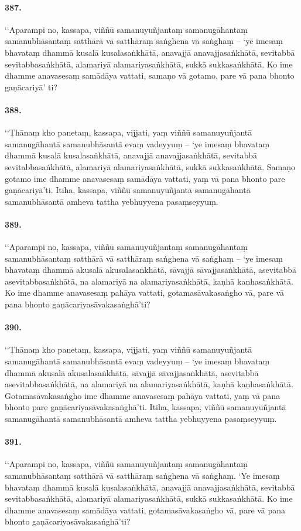 \paragraph{387.} ‘‘Aparampi no, kassapa, viññū samanuyuñjantaṃ samanugāhantaṃ samanubhāsantaṃ satthārā vā satthāraṃ saṅghena vā saṅghaṃ – ‘ye imesaṃ bhavataṃ dhammā kusalā kusalasaṅkhātā, anavajjā anavajjasaṅkhātā, sevitabbā sevitabbasaṅkhātā, alamariyā alamariyasaṅkhātā, sukkā sukkasaṅkhātā. Ko ime dhamme anavasesaṃ samādāya vattati, samaṇo vā gotamo, pare vā pana bhonto gaṇācariyā’ ti?

\paragraph{388.} ‘‘Ṭhānaṃ kho panetaṃ, kassapa, vijjati, yaṃ viññū samanuyuñjantā samanugāhantā samanubhāsantā evaṃ vadeyyuṃ – ‘ye imesaṃ bhavataṃ dhammā kusalā kusalasaṅkhātā, anavajjā anavajjasaṅkhātā, sevitabbā sevitabbasaṅkhātā, alamariyā alamariyasaṅkhātā, sukkā sukkasaṅkhātā. Samaṇo gotamo ime dhamme anavasesaṃ samādāya vattati, yaṃ vā pana bhonto pare gaṇācariyā’ti. Itiha, kassapa, viññū samanuyuñjantā samanugāhantā samanubhāsantā amheva tattha yebhuyyena pasaṃseyyuṃ.

\paragraph{389.} ‘‘Aparampi no, kassapa, viññū samanuyuñjantaṃ samanugāhantaṃ samanubhāsantaṃ satthārā vā satthāraṃ saṅghena vā saṅghaṃ – ‘ye imesaṃ bhavataṃ dhammā akusalā akusalasaṅkhātā, sāvajjā sāvajjasaṅkhātā, asevitabbā asevitabbasaṅkhātā, na alamariyā na alamariyasaṅkhātā, kaṇhā kaṇhasaṅkhātā. Ko ime dhamme anavasesaṃ pahāya vattati, gotamasāvakasaṅgho vā, pare vā pana bhonto gaṇācariyasāvakasaṅghā’ti?

\paragraph{390.} ‘‘Ṭhānaṃ kho panetaṃ, kassapa, vijjati, yaṃ viññū samanuyuñjantā samanugāhantā samanubhāsantā evaṃ vadeyyuṃ – ‘ye imesaṃ bhavataṃ dhammā akusalā akusalasaṅkhātā, sāvajjā sāvajjasaṅkhātā, asevitabbā asevitabbasaṅkhātā, na alamariyā na alamariyasaṅkhātā, kaṇhā kaṇhasaṅkhātā. Gotamasāvakasaṅgho ime dhamme anavasesaṃ pahāya vattati, yaṃ vā pana bhonto pare gaṇācariyasāvakasaṅghā’ti. Itiha, kassapa, viññū samanuyuñjantā samanugāhantā samanubhāsantā amheva tattha yebhuyyena pasaṃseyyuṃ.

\paragraph{391.} ‘‘Aparampi no, kassapa, viññū samanuyuñjantaṃ samanugāhantaṃ samanubhāsantaṃ satthārā vā satthāraṃ saṅghena vā saṅghaṃ. ‘Ye imesaṃ bhavataṃ dhammā kusalā kusalasaṅkhātā, anavajjā anavajjasaṅkhātā, sevitabbā sevitabbasaṅkhātā, alamariyā alamariyasaṅkhātā, sukkā sukkasaṅkhātā. Ko ime dhamme anavasesaṃ samādāya vattati, gotamasāvakasaṅgho vā, pare vā pana bhonto gaṇācariyasāvakasaṅghā’ti?

